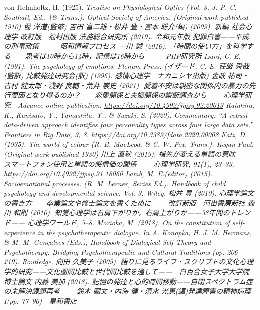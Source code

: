  von Helmholtz, H. (1925). \textit{Treatise on Physiological Optics (Vol. 3, J. P. C. Southall, Ed., \textbackslash\& Trans.). Optical Society of America. (Original work published 1910)
 堀 洋道(監修)  吉田 富二雄・松井 豊・宮本 聡介(編) (2009). 新編 社会心理学 改訂版　福村出版
 法務総合研究所 (2019). 令和元年版 犯罪白書——平成の刑事政策——　昭和情報プロセス
 一川 誠 (2016). 「時間の使い方」を科学する——思考は10時から14時，記憶は16時から——　PHP研究所
 Izard, C. E. (1991). \textit{The psychology of emotions}. Plenum Press.
(イザード, C. E. 荘厳 舜哉(監訳) 比較発達研究会(訳) (1996). 感情心理学　ナカニシヤ出版)
 金政 祐司・古村 健太郎・浅野 良輔・荒井 崇史 (2021). 愛着不安は親密な関係内の暴力の先行要因となり得るのか？——恋愛関係と夫婦関係の縦断調査から—— 心理学研究　Advance online publication. \url{https://doi.org/10.4992/jjpsy.92.20013}
 Katahira, K., Kunisato, Y., Yamashita, Y., \& Suzuki, S. (2020). Commentary: ``A robust data-driven approach identifies four personality types across four large data sets.''. \textit{Frontiers in Big Data, 3}, 8. \url{https://doi.org/10.3389/fdata.2020.00008}
 Katz, D. (1935). \textit{The world of colour} (R. B. MacLeod, \& C. W. Fox, Trans.). Kegan Paul. (Original work published 1930)
 川上 直秋 (2019). 指先が変える単語の意味——スマートフォン使用と単語の感情価の関係—— 心理学研究, \textit{91}(1), 23--33. \url{https://doi.org/10.4992/jjpsy.91.18060}
 Lamb, M. E.(editor)  (2015). \textit{Socioemotional processes}. (R. M. Lerner, Series Ed.). \textit{Handbook of child psychology and developmental science}. \textit{Vol. 3}. Wiley.
 松井 豊 (2010). 心理学論文の書き方——卒業論文や修士論文を書くために—— 改訂新版　河出書房新社
 森川 和則 (2010). 知覚心理学は右肩下がりか，右肩上がりか——38年間のトレンド—— 心理学ワールド, 5--8.
 Morioka, M. (2018). \textit{On the constitution of self-experience in the psychotherapeutic dialogue}. In A. Konopka, H. J. M. Hermans, \& M. M. Gonçalves (Eds.), \textit{Handbook of Dialogical Self Theory and Psychotherapy: Bridging Psychotherapeutic and Cultural Traditions} (pp. 206--219). Routledge.
 向田 久美子 (2009). 語りに見るライフ・スクリプトの文化心理学的研究——文化圏間比較と世代間比較を通して——　白百合女子大学大学院博士論文
 内藤 美加 (2018). 記憶の発達と心的時間移動——自閉スペクトラム症の未解決課題再考—— 鈴木 國文・内海 健・清水 光恵(編)発達障害の精神病理I(pp. 77--96)　星和書店
}
